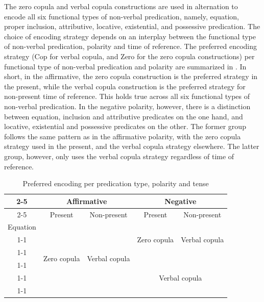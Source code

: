 \documentclass[output=paper,colorlinks,citecolor=brown]{langscibook}
\begin{document}
The zero copula and verbal copula constructions are used in alternation to encode all six functional types of non-verbal predication, namely, equation, proper inclusion, attributive, locative, existential, and possessive predication. The choice of encoding strategy depends on an interplay between the functional type of non-verbal predication, polarity and time of reference. The preferred encoding strategy (Cop for verbal copula, and Zero for the zero copula constructions) per functional type of non-verbal predication and polarity are summarized in . In short, in the affirmative, the zero copula construction is the preferred strategy in the present, while the verbal copula construction is the preferred strategy for non-present time of reference. This holds true across all six functional types of non-verbal predication. In the negative polarity, however, there is a distinction between equation, inclusion and attributive predicates on the one hand, and locative, existential and possessive predicates on the other. The former group follows the same pattern as in the affirmative polarity, with the zero copula strategy used in the present, and the verbal copula strategy elsewhere. The latter group, however, only uses the verbal copula strategy regardless of time of reference.

\begin{table}
\caption{Preferred encoding per predication type, polarity and tense}
\label{yukuna:tableNVNEG2}
\begin{tabular}{c|c|c||c|c|}
\cline{2-5}
                            & \multicolumn{2}{c||}{Affirmative\strut}         & \multicolumn{2}{c|}{Negative}            \\ \cline{2-5}
                            & Present                 & Non-present\strut               & Present                 & Non-present               \\ \hline
\multicolumn{1}{|l|}{Equation\strut}    & \multirow{6}{*}{Zero copula} & \multirow{6}{*}{Verbal copula} & \multirow{3}{*}{Zero copula} & \multirow{3}{*}{Verbal copula} \\ \cline{1-1}
\multicolumn{1}{|l|}{Inclusion\strut}    &                     &                    &                     &                    \\ \cline{1-1}
\multicolumn{1}{|l|}{Attributive\strut}  &                     &                    &                     &                    \\ \cline{1-1} \cline{4-5}
\multicolumn{1}{|l|}{Location\strut}   &                     &                    & \multicolumn{2}{c|}{\multirow{3}{*}{Verbal copula}}  \\ \cline{1-1}
\multicolumn{1}{|l|}{Existential\strut} &                     &                    & \multicolumn{2}{l|}{}                    \\ \cline{1-1}
\multicolumn{1}{|l|}{Possessive\strut}  &                     &                    & \multicolumn{2}{l|}{}                    \\ \hline
\end{tabular}
\end{table}%
\end{document}

